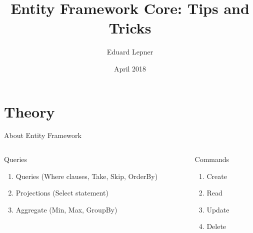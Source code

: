 \documentclass{bredelebeamer}
\title[EFC Tips \& Tricks]{Entity Framework Core: Tips and Tricks}
\author{Eduard Lepner\inst{1}}
\institute[Powel]
{
  \inst{1}%
  Powel AS\\
  Team Leader at Powel Water
  }
\date{April 2018}
\begin{document}
\begin{frame}
  \titlepage
\end{frame}





\section{Theory}

\begin{frame} {About Entity Framework}
    \begin{columns}[t]
        \begin{column}{0.5\textwidth}
            Queries\\[.2cm]
            \begin{enumerate}
                \item Queries (Where clauses, Take, Skip, OrderBy)
                \item Projections (Select statement)
                \item Aggregate (Min, Max, GroupBy)
            \end{enumerate}
            
        \end{column}
        \begin{column}{0.5\textwidth}
            Commands\\[.2cm]
            \begin{enumerate}
                \item Create
                \item Read
                \item Update
                \item Delete
            \end{enumerate}
        \end{column}
    \end{columns}
\end{frame}
\end{document}
